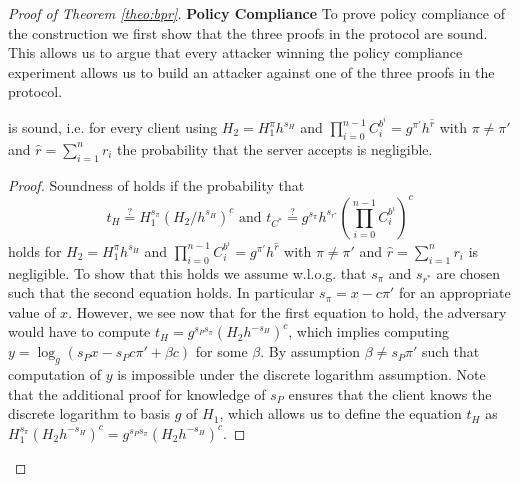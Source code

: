 \begin{proof}[Proof of Theorem \ref{theo:bpr}]
\textbf{Policy Compliance}
To prove policy compliance of the construction we first show that the three proofs in the protocol are sound.
This allows us to argue that every attacker winning the policy compliance experiment allows us to build an attacker against one of the three proofs in the protocol.

\begin{claim}
  \PoE is sound, i.e. for every client using $H_2=H_1^{\pi}h^{s_H}$ and $\prod_{i=0}^{n-1} C^{b^i}_i=g^{\pi'}h^{\hat{r}}$ with $\pi\not=\pi'$ and $\hat{r}=\sum_{i=1}^n r_i$ the probability that the server accepts \PoE is negligible.
\end{claim}

\begin{proof}
Soundness of \PoE holds if the probability that
\[ t_H\stackrel{?}{=} H_1^{s_\pi}(H_2/h^{s_H})^c \text{ and } t_{C^\ast} \stackrel{?}{=} g^{s_\pi}h^{s_{r^\ast}}\left(\prod_{i=0}^{n-1} C^{b^i}_i \right)^c \]
holds for $H_2=H_1^{\pi}h^{s_H}$ and $\prod_{i=0}^{n-1} C^{b^i}_i=g^{\pi'}h^{\hat{r}}$ with $\pi\not=\pi'$ and $\hat{r}=\sum_{i=1}^n r_i$ is negligible.
To show that this holds we assume w.l.o.g. that $s_\pi$ and $s_{r^\ast}$ are chosen such that the second equation holds.
In particular $s_\pi=x-c\pi'$ for an appropriate value of $x$.
However, we see now that for the first equation to hold, the adversary would have to compute $t_H=g^{s_P s_\pi}(H_2h^{-s_H})^c$, which implies computing $y=\log_g(s_P x-s_P c\pi'+\beta c)$ for some $\beta$.
By assumption $\beta\not= s_P\pi'$ such that computation of $y$ is impossible under the discrete logarithm assumption.
Note that the additional proof for knowledge of $s_P$ ensures that the client knows the discrete logarithm to basis $g$ of $H_1$, which allows us to define the equation $t_H$ as $H_1^{s_\pi}(H_2h^{-s_H})^c=g^{s_P s_\pi}(H_2h^{-s_H})^c$.

\end{proof}


\end{proof}
